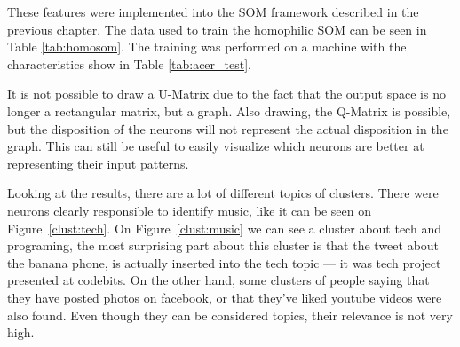 These features were implemented into the \ac{SOM} framework described in the previous chapter. The data used to train the homophilic \ac{SOM} can be seen in Table \ref{tab:homosom}. The training was performed on a machine with the characteristics show in Table \ref{tab:acer_test}.




It is not possible to draw a \ac{U-Matrix} due to the fact that the output space is no longer a rectangular matrix, but a graph. Also drawing, the \ac{Q-Matrix} is possible, but the disposition of the neurons will not represent the actual disposition in the graph. This can still be useful to easily visualize which neurons are better at representing their input patterns. 

Looking at the results, there are a lot of different topics of clusters. There were neurons clearly responsible to identify music, like it can be seen on Figure~\ref{clust:tech}. On Figure~\ref{clust:music} we can see a cluster about tech and programing, the most surprising part about this cluster is that the tweet about the banana phone, is actually inserted into the tech topic --- it was tech project presented at codebits. 
On the other hand, some clusters of people saying that they have posted photos on facebook, or that they've liked youtube videos were also found. Even though they can be considered topics, their relevance is not very high.

